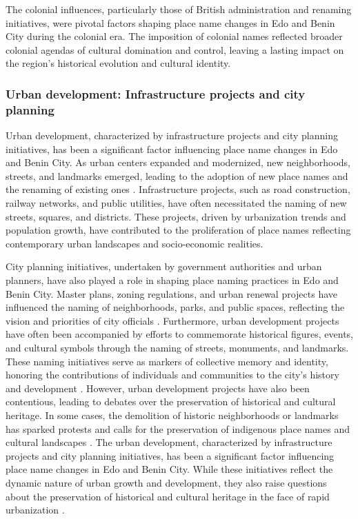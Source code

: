 The colonial influences, particularly those of British administration and renaming initiatives, were pivotal factors shaping place name changes in Edo and Benin City during the colonial era. The imposition of colonial names reflected broader colonial agendas of cultural domination and control, leaving a lasting impact on the region's historical evolution and cultural identity\cite{aigimoukhuede2018benin}.

\subsubsection{Urban development: Infrastructure projects and city planning}

Urban development, characterized by infrastructure projects and city planning initiatives, has been a significant factor influencing place name changes in Edo and Benin City. As urban centers expanded and modernized, new neighborhoods, streets, and landmarks emerged, leading to the adoption of new place names and the renaming of existing ones \cite{nwokeji2010deatlanticizing,aigimoukhuede2018benin}.
Infrastructure projects, such as road construction, railway networks, and public utilities, have often necessitated the naming of new streets, squares, and districts. These projects, driven by urbanization trends and population growth, have contributed to the proliferation of place names reflecting contemporary urban landscapes and socio-economic realities.

City planning initiatives, undertaken by government authorities and urban planners, have also played a role in shaping place naming practices in Edo and Benin City. Master plans, zoning regulations, and urban renewal projects have influenced the naming of neighborhoods, parks, and public spaces, reflecting the vision and priorities of city officials \cite{bigon2009history}.
Furthermore, urban development projects have often been accompanied by efforts to commemorate historical figures, events, and cultural symbols through the naming of streets, monuments, and landmarks. These naming initiatives serve as markers of collective memory and identity, honoring the contributions of individuals and communities to the city's history and development \cite{nwokeji2010deatlanticizing}.
However, urban development projects have also been contentious, leading to debates over the preservation of historical and cultural heritage. In some cases, the demolition of historic neighborhoods or landmarks has sparked protests and calls for the preservation of indigenous place names and cultural landscapes \cite{nwokeji2010deatlanticizing}.
The urban development, characterized by infrastructure projects and city planning initiatives, has been a significant factor influencing place name changes in Edo and Benin City. While these initiatives reflect the dynamic nature of urban growth and development, they also raise questions about the preservation of historical and cultural heritage in the face of rapid urbanization \cite{aigimoukhuede2018benin}.
